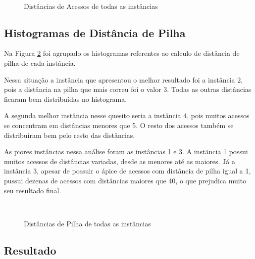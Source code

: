 \documentclass[12pt]{article}
\begin{document}
\begin{figure}
\centering
\mbox{\quad
{}}
\mbox{\quad
{}}
\caption{Distâncias de Acessos de todas as instâncias} \label{img_dist_acess}
\end{figure}


\subsection{Histogramas de Distância de Pilha}
\label{hist_dist_pilha}


Na Figura \ref{img_dist_pilha} foi agrupado os histogramas referentes ao calculo de distância de pilha de cada instância.

Nessa situação a instância que apresentou o melhor resultado foi a instância 2, pois a distância na pilha que mais correu foi o valor 3. Todas as outras distâncias ficaram bem distribuídas no histograma.

A segunda melhor instância nesse quesito seria a instância 4, pois muitos acessos se concentram em distâncias menores que 5. O resto dos acessos também se distribuíram bem pelo resto das distâncias.

As piores instâncias nessa análise foram as instâncias 1 e 3. A instãncia 1 possui muitos acessos de distâncias variadas, desde as menores até as maiores. Já a instância 3, apesar de possuir o ápice de acessos com distância de pilha igual a 1, pussui dezenas de acessos com distâncias maiores que 40, o que prejudica muito seu resultado final.

\begin{figure}
\centering
\mbox{\quad
{}}
\mbox{\quad
{}}
\caption{Distâncias de Pilha de todas as instâncias} \label{img_dist_pilha}
\end{figure}



\subsection{Resultado}
\end{document}
